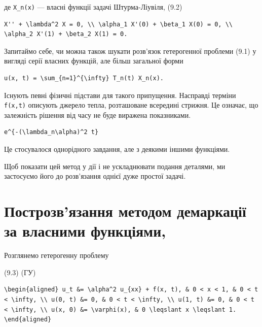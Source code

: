 \documentclass[
  ukrainian,
]{article}
\begin{document}
де \texttt{X\_n(x)} --- власні функції задачі Штурма-Ліувіля, (9.2)

\begin{verbatim}
X'' + \lambda^2 X = 0, \\ \alpha_1 X'(0) + \beta_1 X(0) = 0, \\ \alpha_2 X'(1) + \beta_2 X(1) = 0.
\end{verbatim}

Запитаймо себе, чи можна також шукати розв'язок гетерогенної проблеми
(9.1) у вигляді серії власних функцій, але більш загальної форми

\begin{verbatim}
u(x, t) = \sum_{n=1}^{\infty} T_n(t) X_n(x).
\end{verbatim}

Існують певні фізичні підстави для такого припущення. Насправді терміни
\texttt{f(x,t)} описують джерело тепла, розташоване всередині стрижня.
Це означає, що залежність рішення від часу не буде виражена показниками.

\begin{verbatim}
e^{-(\lambda_n\alpha)^2 t}
\end{verbatim}

Це стосувалося однорідного завдання, але з деякими іншими функціями.

Щоб показати цей метод у дії і не ускладнювати подання деталями, ми
застосуємо його до розв'язання однієї дуже простої задачі.

\section{Построзв'язання методом демаркації за власними
функціями,}\label{ux43fux43eux441ux442ux440ux43eux437ux432ux44fux437ux430ux43dux43dux44f-ux43cux435ux442ux43eux434ux43eux43c-ux434ux435ux43cux430ux440ux43aux430ux446ux456ux457-ux437ux430-ux432ux43bux430ux441ux43dux438ux43cux438-ux444ux443ux43dux43aux446ux456ux44fux43cux438}

Розглянемо гетерогенну проблему

(9.3) (ГУ)

\begin{verbatim}
\begin{aligned} u_t &= \alpha^2 u_{xx} + f(x, t), & 0 < x < 1, & 0 < t < \infty, \\ u(0, t) &= 0, & 0 < t < \infty, \\ u(1, t) &= 0, & 0 < t < \infty, \\ u(x, 0) &= \varphi(x), & 0 \leqslant x \leqslant 1. \end{aligned}
\end{verbatim}
\end{document}
